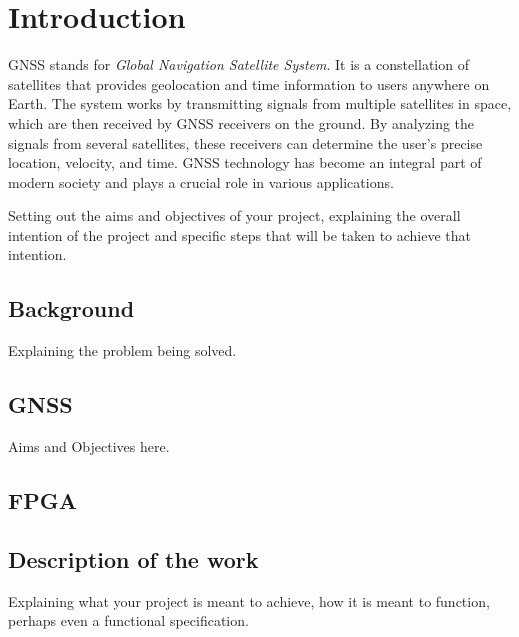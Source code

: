 \chapter{Introduction}

GNSS stands for \textit{Global Navigation Satellite System}. It is a constellation of satellites that provides geolocation and time information to users anywhere on Earth. The system works by transmitting signals from multiple satellites in space, which are then received by GNSS receivers on the ground. By analyzing the signals from several satellites, these receivers can determine the user's precise location, velocity, and time. GNSS technology has become an integral part of modern society and plays a crucial role in various applications.

Setting out the aims and objectives of your project, explaining the overall intention of the project and specific steps that will be taken to achieve that intention.

\section{Background}

Explaining the problem being solved.


\section{GNSS}

Aims and Objectives here.

\section{FPGA}


\section{Description of the work}

Explaining what your project is meant to achieve, how it is meant to function, perhaps even a functional specification.


